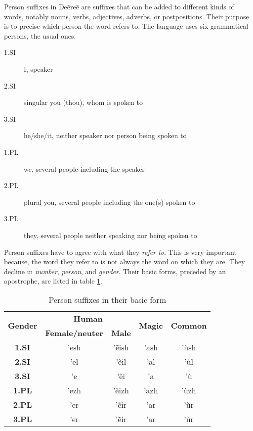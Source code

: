 Person suffixes in Deẽreẽ are suffixes that can be added to different kinds of words, notably nouns,
verbs, adjectives, adverbs, or postpositions. Their purpose is to precise which person the word
refers to. The language uses six grammatical persons, the usual ones:

\begin{description}
\item[1.SI] I, speaker
\item[2.SI] singular you (thou), whom is spoken to
\item[3.SI] he/she/it, neither speaker nor person being spoken to
\item[1.PL] we, several people including the speaker
\item[2.PL] plural you, several people including the one(s) spoken to
\item[3.PL] they, several people neither speaking nor being spoken to
\end{description}

Person suffixes have to agree with what they \emph{refer to}. This is very important because, the
word they refer to is not always the word on which they are. They decline in \emph{number},
\emph{person}, and \emph{gender}. Their basic forms, preceded by an apostrophe, are listed in table
\ref{tab:morph-basic-pers-suff}.

\begin{table}[h]
\begin{center}\label{tab:morph-basic-pers-suff}
\begin{tabular}{|c||c|c|c|c|}
\hline
\multirow{2}{*}{\textbf{Gender}} & \multicolumn{2}{|c|}{\textbf{Human}} & \multirow{2}{*}{\textbf{Magic}} & \multirow{2}{*}{\textbf{Common}}\\
                                 & \textbf{Female/neuter} & \textbf{Male} & & \\\hline\hline
\textbf{1.SI}                    & ’esh & ’ẽish & ’ash & ’ùsh \\\hline
\textbf{2.SI}                    & ’el  & ’ẽil  & ’al  & ’ùl  \\\hline
\textbf{3.SI}                    & ’e   & ’ẽi   & ’a   & ’ù   \\\hline
\textbf{1.PL}                    & ’ezh & ’ẽizh & ’azh & ’ùzh \\\hline
\textbf{2.PL}                    & ’er  & ’ẽir  & ’ar  & ’ùr  \\\hline
\textbf{3.PL}                    & ’er  & ’ẽir  & ’ar  & ’ùr  \\\hline
\end{tabular}
\end{center}
\caption{Person suffixes in their basic form}
\end{table}

